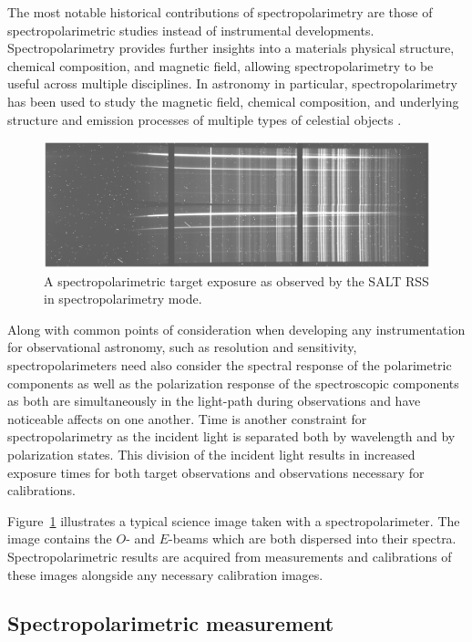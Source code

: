 The most notable historical contributions of spectropolarimetry are those of spectropolarimetric studies instead of instrumental developments. Spectropolarimetry provides further insights into a materials physical structure, chemical composition, and magnetic field, allowing spectropolarimetry to be useful across multiple disciplines. In astronomy in particular, spectropolarimetry has been used to study the magnetic field, chemical composition, and underlying structure and emission processes of multiple types of celestial objects \citep[see for example][]{specpol_AGN, specpol_stars, specpol_SN}.

\begin{figure}[t]
    \centering
    \includegraphics[width=1.0\textwidth]{figures/2_specpol_sci.pdf}
    \caption{A spectropolarimetric target exposure as observed by the \gls{SALT} \gls{RSS} in spectropolarimetry mode.}
    \label{fig:specpol_exp}
\end{figure}

Along with common points of consideration when developing any instrumentation for observational astronomy, such as resolution and sensitivity, spectropolarimeters need also consider the spectral response of the polarimetric components as well as the polarization response of the spectroscopic components as both are simultaneously in the light-path during observations and have noticeable affects on one another. Time is another constraint for spectropolarimetry as the incident light is separated both by wavelength and by polarization states. This division of the incident light results in increased exposure times for both target observations and observations necessary for calibrations.

Figure~\ref{fig:specpol_exp} illustrates a typical science image taken with a spectropolarimeter. The image contains the $O$- and $E$-beams which are both dispersed into their spectra. Spectropolarimetric results are acquired from measurements and calibrations of these images alongside any necessary calibration images.

\subsection{Spectropolarimetric measurement}

